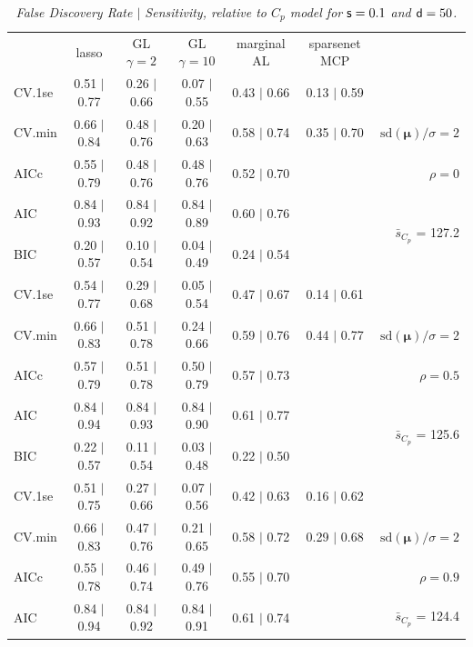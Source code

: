 \documentclass[12pt]{article}
\newcommand{\mr}[1]{\mathrm{#1}}
\newcommand{\bm}[1]{\mathbf{#1}}
\begin{document}
\begin{table}[p]\vspace{-.5cm}
\caption[l]{\it False Discovery Rate $\mid$ Sensitivity, relative to $C_p$ model  for ${\sf s}=0.1$ and ${\sf d}=50$.}
\vspace{-.5cm}
\small{}
\begin{center}
\begin{tabular}{l*{5}{c}|r}
 & lasso & GL $\gamma=2$ & GL $\gamma=10$ & marginal AL & sparsenet MCP  & \\
 \cline{1-7}
CV.1se & 0.51 $\mid$ 0.77 & 0.26 $\mid$ 0.66 & 0.07 $\mid$ 0.55 & 0.43 $\mid$ 0.66 & 0.13 $\mid$ 0.59 &\\
CV.min & 0.66 $\mid$ 0.84 & 0.48 $\mid$ 0.76 & 0.20 $\mid$ 0.63 & 0.58 $\mid$ 0.74 & 0.35 $\mid$ 0.70 &  $\mr{sd}(\bm{\mu})/\sigma=2$ \\
AICc & 0.55 $\mid$ 0.79 & 0.48 $\mid$ 0.76 & 0.48 $\mid$ 0.76 & 0.52 $\mid$ 0.70 & & $\rho=0$ \\
AIC & 0.84 $\mid$ 0.93 & 0.84 $\mid$ 0.92 & 0.84 $\mid$ 0.89 & 0.60 $\mid$ 0.76 & & \multirow{2}{*}{$\bar{s}_{C_p}$ = 127.2} \\
BIC & 0.20 $\mid$ 0.57 & 0.10 $\mid$ 0.54 & 0.04 $\mid$ 0.49 & 0.24 $\mid$ 0.54 & & \\
 \hline 
CV.1se & 0.54 $\mid$ 0.77 & 0.29 $\mid$ 0.68 & 0.05 $\mid$ 0.54 & 0.47 $\mid$ 0.67 & 0.14 $\mid$ 0.61 &\\
CV.min & 0.66 $\mid$ 0.83 & 0.51 $\mid$ 0.78 & 0.24 $\mid$ 0.66 & 0.59 $\mid$ 0.76 & 0.44 $\mid$ 0.77 &  $\mr{sd}(\bm{\mu})/\sigma=2$ \\
AICc & 0.57 $\mid$ 0.79 & 0.51 $\mid$ 0.78 & 0.50 $\mid$ 0.79 & 0.57 $\mid$ 0.73 & & $\rho=0.5$ \\
AIC & 0.84 $\mid$ 0.94 & 0.84 $\mid$ 0.93 & 0.84 $\mid$ 0.90 & 0.61 $\mid$ 0.77 & & \multirow{2}{*}{$\bar{s}_{C_p}$ = 125.6} \\
BIC & 0.22 $\mid$ 0.57 & 0.11 $\mid$ 0.54 & 0.03 $\mid$ 0.48 & 0.22 $\mid$ 0.50 & & \\
 \hline 
CV.1se & 0.51 $\mid$ 0.75 & 0.27 $\mid$ 0.66 & 0.07 $\mid$ 0.56 & 0.42 $\mid$ 0.63 & 0.16 $\mid$ 0.62 &\\
CV.min & 0.66 $\mid$ 0.83 & 0.47 $\mid$ 0.76 & 0.21 $\mid$ 0.65 & 0.58 $\mid$ 0.72 & 0.29 $\mid$ 0.68 &  $\mr{sd}(\bm{\mu})/\sigma=2$ \\
AICc & 0.55 $\mid$ 0.78 & 0.46 $\mid$ 0.74 & 0.49 $\mid$ 0.76 & 0.55 $\mid$ 0.70 & & $\rho=0.9$ \\
AIC & 0.84 $\mid$ 0.94 & 0.84 $\mid$ 0.92 & 0.84 $\mid$ 0.91 & 0.61 $\mid$ 0.74 & & \multirow{2}{*}{$\bar{s}_{C_p}$ = 124.4} \\

\end{tabular}
\end{center}
\end{table}
\end{document}
